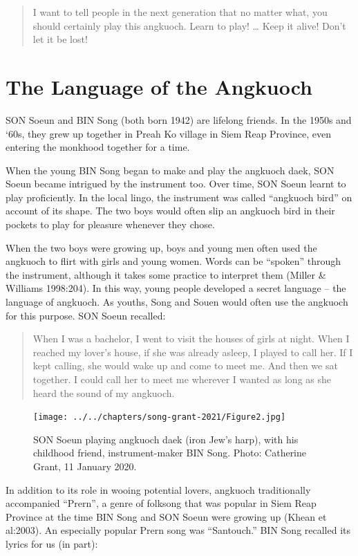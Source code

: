 \documentclass[twoside]{article}
\begin{document}
\begin{quote}
I want to tell people in the next generation that no matter what, you
should certainly play this angkuoch. Learn to play! \ldots{} Keep it
alive! Don't let it be lost!
\end{quote}

\hypertarget{the-language-of-the-angkuoch}{%
\section*{The Language of the
Angkuoch}\label{the-language-of-the-angkuoch}}

SON Soeun and BIN Song (both born 1942) are lifelong friends. In the
1950s and `60s, they grew up together in Preah Ko village in Siem Reap
Province, even entering the monkhood together for a time.

When the young BIN Song began to make and play the angkuoch daek, SON
Soeun became intrigued by the instrument too. Over time, SON Soeun
learnt to play proficiently. In the local lingo, the instrument was
called ``angkuoch bird'' on account of its shape. The two boys would
often slip an angkuoch bird in their pockets to play for pleasure
whenever they chose.

When the two boys were growing up, boys and young men often used the
angkuoch to flirt with girls and young women. Words can be ``spoken''
through the instrument, although it takes some practice to interpret
them (Miller \& Williams 1998:204). In this way, young people developed
a secret language -- the language of angkuoch. As youths, Song and Souen
would often use the angkuoch for this purpose. SON Soeun recalled:

\begin{quote}
When I was a bachelor, I went to visit the houses of girls at night.
When I reached my lover's house, if she was already asleep, I played to
call her. If I kept calling, she would wake up and come to meet me. And
then we sat together. I could call her to meet me wherever I wanted as
long as she heard the sound of my angkuoch.
\end{quote}

\begin{figure}[ht]
  \texttt{[image: ../../chapters/song-grant-2021/Figure2.jpg]}
  \caption{SON Soeun playing angkuoch
  daek (iron Jew's harp), with his childhood friend, instrument-maker BIN
  Song. Photo: Catherine Grant, 11 January 2020.}
\end{figure}

In addition to its role in wooing potential lovers, angkuoch
traditionally accompanied ``Prern'', a genre of folksong that was
popular in Siem Reap Province at the time BIN Song and SON Soeun were
growing up (Khean et al:2003). An especially popular Prern song was
``Santouch.'' BIN Song recalled its lyrics for us (in part):
\end{document}
